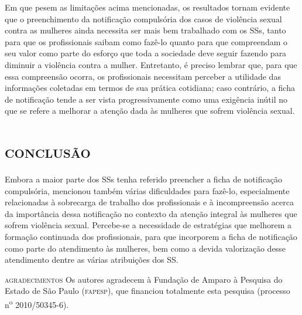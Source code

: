 \documentclass{article}
\begin{document}
Em que pesem as limitações acima mencionadas, os resultados tornam evidente que
o preenchimento da notificação compulsória dos casos de violência sexual contra
as mulheres ainda necessita ser mais bem trabalhado com os SSs, tanto para que
os profissionais saibam como fazê-lo quanto para que compreendam o seu valor
como parte do esforço que toda a sociedade deve seguir fazendo para diminuir a
violência contra a mulher. Entretanto, é preciso lembrar que, para que essa
compreensão ocorra, os profissionais necessitam perceber a utilidade das
informações coletadas em termos de sua prática cotidiana; caso contrário, a
ficha de notificação tende a ser vista progressivamente como uma exigência
inútil no que se refere a melhorar a atenção dada às mulheres que sofrem
violência sexual.

\section{\textsc{conclusão}}

Embora a maior parte dos SSs tenha referido preencher a ficha de notificação
compulsória, mencionou também várias dificuldades para fazê-lo, especialmente
relacionadas à sobrecarga de trabalho dos profissionais e à incompreensão acerca
da importância dessa notificação no contexto da atenção integral às mulheres que
sofrem violência sexual. Percebe-se a necessidade de estratégias que melhorem a
formação continuada dos profissionais, para que incorporem a ficha de
notificação como parte do atendimento às mulheres, bem como a devida valorização
desse atendimento dentre as várias atribuições dos SS.

\textsc{agradecimentos}
Os autores agradecem à Fundação de Amparo à Pesquisa do Estado de São Paulo
(\textsc{fapesp}), que financiou totalmente esta pesquisa (processo n\textsuperscript{o}
2010/50345-6).
\end{document}
